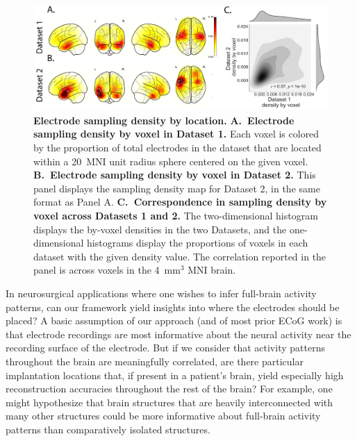\documentclass[11pt]{article}
\begin{document}
\begin{figure}
  \centering
  \includegraphics[width=\textwidth]{figs/density}
  \caption{\textbf{Electrode sampling density by location.}
    \textbf{A.~Electrode sampling density by voxel in Dataset 1.} Each
    voxel is colored by the proportion of total electrodes in the
    dataset that are
    located within a 20~MNI unit radius sphere centered on the given
    voxel.  \textbf{B.~Electrode sampling density by voxel in Dataset
      2.}  This panel displays the sampling density map for Dataset 2,
    in the same format as Panel A.  \textbf{C.~Correspondence in
      sampling density by voxel across Datasets 1 and 2.}  The
    two-dimensional histogram displays the by-voxel densities in the
    two Datasets, and the one-dimensional histograms display the
    proportions of voxels in each dataset with the given density
    value.  The correlation reported in the panel is across voxels in
    the 4~mm$^3$ MNI brain.}
  \label{fig:density}
\end{figure}

In neurosurgical applications where one wishes to infer full-brain
activity patterns, can our framework yield insights into where the
electrodes should be placed?  A basic assumption of our approach (and
of most prior ECoG work) is that electrode recordings are most
informative about the neural activity near the recording surface of
the electrode.  But if we consider that activity patterns throughout
the brain are meaningfully correlated, are there particular
implantation locations that, if present in a patient's brain, yield
especially high reconstruction accuracies throughout the rest of the
brain?  For example, one might hypothesize that brain structures that
are heavily interconnected with many other structures could be more
informative about full-brain activity patterns than comparatively
isolated structures.
\end{document}
